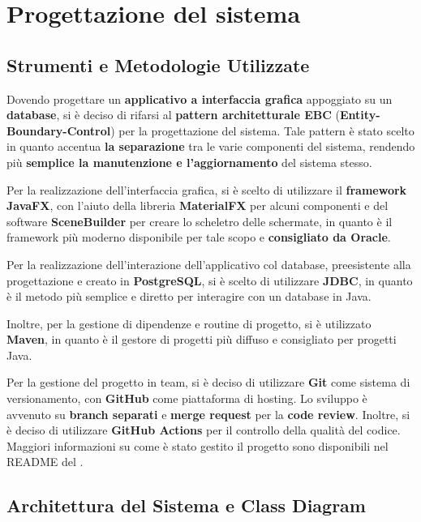 \chapter{Progettazione del sistema}

\section{Strumenti e Metodologie Utilizzate}

Dovendo progettare un \textbf{applicativo a interfaccia grafica} appoggiato su un \textbf{database}, 
si è deciso di rifarsi al \textbf{pattern architetturale EBC} (\textbf{Entity-Boundary-Control}) per
la progettazione del sistema. Tale pattern è stato scelto in quanto accentua 
\textbf{la separazione} tra le varie componenti del sistema, rendendo
più \textbf{semplice la manutenzione e l'aggiornamento} del sistema stesso.

Per la realizzazione dell'interfaccia grafica, si è scelto di utilizzare il 
\textbf{framework JavaFX}, con l'aiuto della libreria \textbf{MaterialFX} 
per alcuni componenti e del software \textbf{SceneBuilder} per creare lo scheletro
delle schermate, in quanto è il framework più moderno disponibile 
per tale scopo e \textbf{consigliato da Oracle}.

Per la realizzazione dell'interazione dell'applicativo col database, preesistente 
alla progettazione e creato in \textbf{PostgreSQL}, si è scelto di utilizzare
\textbf{JDBC}, in quanto è il metodo più semplice e diretto per interagire con un
database in Java.

Inoltre, per la gestione di dipendenze e routine di progetto, si è utilizzato
\textbf{Maven}, in quanto è il gestore di progetti più diffuso e consigliato per
progetti Java.

\begin{note}
  Per la gestione del progetto in team, si è deciso di utilizzare \textbf{Git} come
  sistema di versionamento, con \textbf{GitHub} come piattaforma di hosting. Lo sviluppo è
  avvenuto su \textbf{branch separati} e \textbf{merge request} per la \textbf{code review}.
  Inoltre, si è deciso di utilizzare \textbf{GitHub Actions} per il controllo della qualità
  del codice. Maggiori informazioni su come è stato gestito il progetto sono disponibili
  nel README del .
\end{note}

\section{Architettura del Sistema e Class Diagram}

